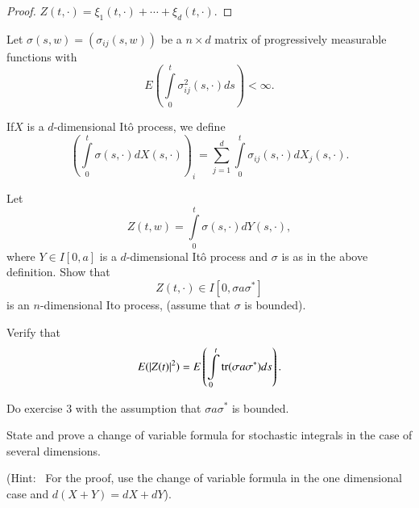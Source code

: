 \begin{proof}
$Z(t,\cdot)=\xi_{1}(t,\cdot)+\cdots+\xi_{d}(t,\cdot)$.
\end{proof}

\begin{defi*}
Let $\sigma(s,w)=(\sigma_{ij}(s,w))$ be a $n\times d$ matrix of
progressively measurable functions with
$$
E\left(\int\limits^{t}_{0}\sigma^{2}_{ij}(s,\cdot)ds\right)<\infty.
$$

If\pageoriginale $X$ is a $d$-dimensional It\^o process, we define
$$
\left(\int\limits^{t}_{0}\sigma(s,\cdot)dX(s,\cdot)\right)_{i}=\sum\limits^{d}_{j=1}\int\limits^{t}_{0}\sigma_{ij}(s,\cdot)dX_{j}(s,\cdot).
$$
\end{defi*}

\begin{exercise}\label{chap13-exer3}
Let
$$
Z(t,w)=\int\limits^{t}_{0}\sigma(s,\cdot)dY(s,\cdot),
$$
where $Y\in I[0,a]$ is a $d$-dimensional It\^o process and $\sigma$ is
as in the above definition. Show that
$$
Z(t,\cdot)\in I[0,\sigma a\sigma^{*}]
$$
is an $n$-dimensional Ito process, (assume that $\sigma$ is bounded).
\end{exercise}

\begin{exercise}\label{chap13-exer4}
Verify that
$$
E(|Z(t)|^{2})=E\left(\int\limits^{t}_{0}\operatorname{tr}(\sigma
a\sigma^{*})ds\right).
$$
\end{exercise}

\begin{exercise}\label{chap13-exer5}
Do exercise 3 with the assumption that $\sigma a\sigma^{*}$ is bounded.
\end{exercise}

\begin{exercise}\label{chap13-exer6}
State and prove a change of variable formula for stochastic integrals
in the case of several dimensions.

\noindent
(Hint:~ For the proof, use the change of variable formula in the one
dimensional case and $d(X+Y)=dX+dY$).
\end{exercise}
